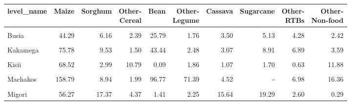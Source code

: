 \begin{table}[!h]
\centering
\begin{tabular}{lrrrrrrrrr}
\toprule
level\_name & Maize & Sorghum & \makecell{Other-\\Cereal} & Bean & \makecell{Other-\\Legume} & Cassava & Sugarcane & \makecell{Other-\\RTBs} & \makecell{Other-\\Non-food}\\
\midrule
\cellcolor{gray!10}{Bungoma} & \cellcolor{gray!10}{91.63} & \cellcolor{gray!10}{11.74} & \cellcolor{gray!10}{2.46} & \cellcolor{gray!10}{57.88} & \cellcolor{gray!10}{2.17} & \cellcolor{gray!10}{2.91} & \cellcolor{gray!10}{7.87} & \cellcolor{gray!10}{8.79} & \cellcolor{gray!10}{8.25}\\
Busia & 44.29 & 6.16 & 2.39 & 25.79 & 1.76 & 3.50 & 5.13 & 4.28 & 2.42\\
\cellcolor{gray!10}{Homa Bay} & \cellcolor{gray!10}{70.27} & \cellcolor{gray!10}{25.39} & \cellcolor{gray!10}{3.15} & \cellcolor{gray!10}{0.46} & \cellcolor{gray!10}{9.63} & \cellcolor{gray!10}{5.94} & \cellcolor{gray!10}{5.10} & \cellcolor{gray!10}{0.17} & \cellcolor{gray!10}{5.32}\\
Kakamega & 75.78 & 9.53 & 1.50 & 43.44 & 2.48 & 3.07 & 8.91 & 6.89 & 3.59\\
\cellcolor{gray!10}{Kiambu} & \cellcolor{gray!10}{41.28} & \cellcolor{gray!10}{0.09} & \cellcolor{gray!10}{0.47} & \cellcolor{gray!10}{30.46} & \cellcolor{gray!10}{0.92} & \cellcolor{gray!10}{0.13} & \cellcolor{gray!10}{-} & \cellcolor{gray!10}{21.24} & \cellcolor{gray!10}{31.11}\\
\addlinespace
Kisii & 68.52 & 2.99 & 10.79 & 0.09 & 1.86 & 1.07 & 1.70 & 0.63 & 11.88\\
\cellcolor{gray!10}{Kitui} & \cellcolor{gray!10}{116.53} & \cellcolor{gray!10}{30.68} & \cellcolor{gray!10}{30.68} & \cellcolor{gray!10}{69.77} & \cellcolor{gray!10}{97.76} & \cellcolor{gray!10}{1.70} & \cellcolor{gray!10}{-} & \cellcolor{gray!10}{0.78} & \cellcolor{gray!10}{5.08}\\
Machakos & 158.79 & 8.94 & 1.99 & 96.77 & 71.39 & 4.52 & - & 6.98 & 16.36\\
\cellcolor{gray!10}{Makueni} & \cellcolor{gray!10}{107.91} & \cellcolor{gray!10}{8.16} & \cellcolor{gray!10}{2.99} & \cellcolor{gray!10}{56.32} & \cellcolor{gray!10}{64.68} & \cellcolor{gray!10}{0.55} & \cellcolor{gray!10}{-} & \cellcolor{gray!10}{1.08} & \cellcolor{gray!10}{11.84}\\
Migori & 56.27 & 17.37 & 4.37 & 1.41 & 2.25 & 15.64 & 19.29 & 2.60 & 0.29\\
\bottomrule
\end{tabular}
\end{table}
